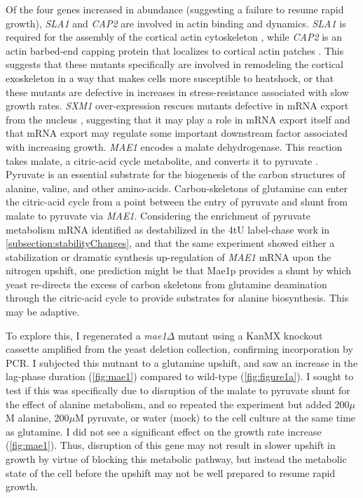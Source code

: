 Of the four genes increased in abundance (suggesting a failure to
resume rapid growth), \textit{SLA1} and
\textit{CAP2} are involved in actin binding and dynamics.
\textit{SLA1} is required for the assembly of the cortical actin
cytoskeleton \parencite{}, while \textit{CAP2} is an actin barbed-end
capping protein that localizes to cortical actin patches \parencite{}. 
This suggests that these mutants specifically are involved in
remodeling the cortical exoskeleton in a way that makes cells more
susceptible to heatshock, or that these mutants are defective in
increases in stress-resistance associated with slow growth rates.
\textit{SXM1} over-expression rescues mutants defective in mRNA export 
from the nucleus \parencite{seedorf1999importin}, suggesting that it
may play a role in mRNA export itself and that mRNA export may
regulate some important downstream factor associated with increasing
growth.
\textit{MAE1} encodes a malate dehydrogenase. This reaction takes
malate, a citric-acid cycle metabolite, and converts it to pyruvate
\parencite{boles1998identification}.
Pyruvate is an essential substrate for the
biogenesis of the carbon structures of alanine, valine, and other 
amino-acids.
Carbon-skeletons of glutamine can enter the citric-acid cycle from a
point between the entry of pyruvate and shunt from malate to pyruvate
via \textit{MAE1}.
Considering the enrichment of pyruvate metabolism mRNA identified as 
destabilized in the 4tU label-chase work in 
\autoref{subsection:stabilityChanges}, and that the same experiment 
showed either a stabilization or dramatic synthesis up-regulation of 
\textit{MAE1} mRNA upon the nitrogen upshift, one prediction might 
be that Mae1p provides a shunt by which yeast re-directs the excess of
carbon skeletons from glutamine deamination through the citric-acid
cycle to provide substrates for alanine biosynthesis. This may be
adaptive.

To explore this, I regenerated a \textit{mae1}$\Delta$ mutant using
a KanMX knockout cassette amplified from the yeast deletion
collection, confirming incorporation by PCR. I subjected this mutnant
to a glutamine upshift, and saw an increase in the lag-phase duration
(\autoref{fig:mae1})
compared to wild-type (\autoref{fig:figure1a}). I sought to test if this
was specifically due to disruption of the malate to pyruvate shunt for
the effect of alanine metabolism, and so repeated the experiment but
added 200$\mu$M alanine, 200$\mu$M pyruvate, or water (mock) to the 
cell culture at the same time as glutamine.
I did not see a significant effect on the growth rate increase
(\autoref{fig:mae1}).
Thus, disruption of this gene may not result in slower upshift in
growth by virtue of blocking this metabolic pathway, but instead the
metabolic state of the cell before the upshift may not be well 
prepared to resume rapid growth.

